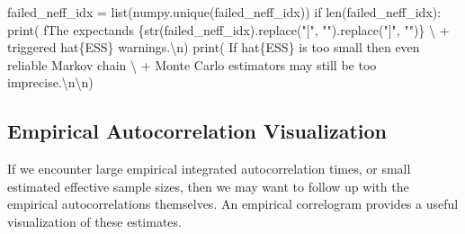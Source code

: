 \documentclass[
  letterpaper,
  DIV=11,
  numbers=noendperiod]{scrartcl}
\newenvironment{Shaded}{\begin{snugshade}}{\end{snugshade}}
\newcommand{\BuiltInTok}[1]{\textcolor[rgb]{0.00,0.23,0.31}{#1}}
\newcommand{\CharTok}[1]{\textcolor[rgb]{0.13,0.47,0.30}{#1}}
\newcommand{\ControlFlowTok}[1]{\textcolor[rgb]{0.00,0.23,0.31}{#1}}
\newcommand{\NormalTok}[1]{\textcolor[rgb]{0.00,0.23,0.31}{#1}}
\newcommand{\OperatorTok}[1]{\textcolor[rgb]{0.37,0.37,0.37}{#1}}
\newcommand{\SpecialCharTok}[1]{\textcolor[rgb]{0.37,0.37,0.37}{#1}}
\newcommand{\SpecialStringTok}[1]{\textcolor[rgb]{0.13,0.47,0.30}{#1}}
\newcommand{\StringTok}[1]{\textcolor[rgb]{0.13,0.47,0.30}{#1}}
\begin{document}
\begin{Shaded}
\begin{Highlighting}[]
\NormalTok{  failed\_neff\_idx }\OperatorTok{=} \BuiltInTok{list}\NormalTok{(numpy.unique(failed\_neff\_idx))}
  \ControlFlowTok{if} \BuiltInTok{len}\NormalTok{(failed\_neff\_idx):}
    \BuiltInTok{print}\NormalTok{( }\SpecialStringTok{f\textquotesingle{}The expectands }\SpecialCharTok{\{}\BuiltInTok{str}\NormalTok{(failed\_neff\_idx)}\SpecialCharTok{.}\NormalTok{replace(}\StringTok{"["}\NormalTok{, }\StringTok{""}\NormalTok{)}\SpecialCharTok{.}\NormalTok{replace(}\StringTok{"]"}\NormalTok{, }\StringTok{""}\NormalTok{)}\SpecialCharTok{\}}\SpecialStringTok{\textquotesingle{}}\NormalTok{ \textbackslash{}}
          \OperatorTok{+} \StringTok{\textquotesingle{} triggered hat}\SpecialCharTok{\{ESS\}}\StringTok{ warnings.}\CharTok{\textbackslash{}n}\StringTok{\textquotesingle{}}\NormalTok{)}
    \BuiltInTok{print}\NormalTok{(  }\StringTok{\textquotesingle{}  If hat}\SpecialCharTok{\{ESS\}}\StringTok{ is too small then even reliable Markov chain\textquotesingle{}}\NormalTok{ \textbackslash{}}
          \OperatorTok{+} \StringTok{\textquotesingle{} Monte Carlo estimators may still be too imprecise.}\CharTok{\textbackslash{}n\textbackslash{}n}\StringTok{\textquotesingle{}}\NormalTok{)}
\end{Highlighting}
\end{Shaded}

\hypertarget{empirical-autocorrelation-visualization}{%
\subsection{Empirical Autocorrelation
Visualization}\label{empirical-autocorrelation-visualization}}

If we encounter large empirical integrated autocorrelation times, or
small estimated effective sample sizes, then we may want to follow up
with the empirical autocorrelations themselves. An empirical correlogram
provides a useful visualization of these estimates.
\end{document}
